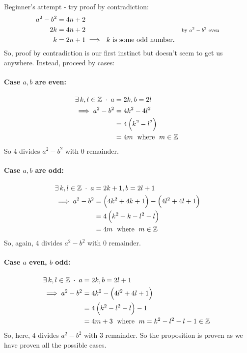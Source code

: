 \documentclass[MathsNotesBase.tex]{subfiles}
\begin{document}
{		\bigskip
		Beginner's attempt - try proof by contradiction:
		\begin{align*}
		a^2 - b^2 &= 4n + 2 \\
		2k &= 4n + 2 &\text{\scriptsize{by $a^2 - b^2$ even}}\\
		k &= 2n + 1 \implies \text{ $k$ is some odd number.}
		\end{align*}
		So, proof by contradiction is our first instinct but doesn't seem to get us anywhere.
		Instead, proceed by cases:
		\paragraph{Case $a, b$ are even:}
		\begin{align*}
		\exists\,k,l \in \mathbb{Z}^{\;} \cdot \;a &= 2k, b = 2l \\
		\implies a^2 - b^2 &= 4k^2 - 4l^2 \\
		&= 4\left(k^2 - l^2\right) \\
		&= 4m\; \text{ where } \;m \in \mathbb{Z}^{\;}  \\
		\end{align*}
		So $4$ divides $a^2 - b^2$ with $0$ remainder.
		\paragraph{Case $a, b$ are odd:}
		\begin{align*}
		\exists\,k,l \in \mathbb{Z}^{\;} \cdot \;a &= 2k+1, b = 2l+1 \\
		\implies a^2 - b^2 &= \left(4k^2 + 4k + 1\right) - \left(4l^2 + 4l + 1\right) \\
		&= 4\left(k^2 + k - l^2 - l\right) \\
		&= 4m\; \text{ where } \;m \in \mathbb{Z}^{\;}  \\
		\end{align*}
		So, again, $4$ divides $a^2 - b^2$ with $0$ remainder.
		\paragraph{Case $a$ even, $b$ odd:}
		\begin{align*}
		\exists\,k,l \in \mathbb{Z}^{\;} \cdot \;a &= 2k, b = 2l+1 \\
		\implies a^2 - b^2 &= 4k^2 - \left(4l^2 + 4l + 1\right) \\
		&= 4\left(k^2 - l^2 - l\right) - 1 \\
		&= 4m + 3\; \text{ where } \;m=k^2 - l^2 - l - 1 \in \mathbb{Z}^{\;}  \\
		\end{align*}
		So, here, $4$ divides $a^2 - b^2$ with $3$ remainder. So the proposition is proven as we have proven all the possible cases.\\
	}
	
\end{document}
